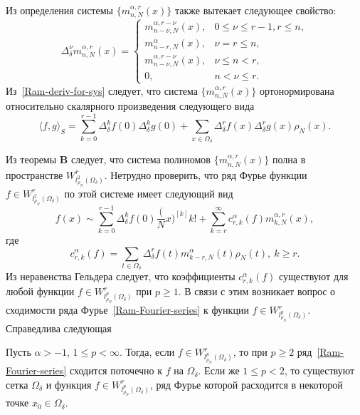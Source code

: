 Из определения системы $\{m_{n,N}^{\alpha,r}(x)\}$ также вытекает следующее свойство:
\begin{equation}\label{Ram-deriv-for-sys}
\Delta_\delta^\nu m_{n,N}^{\alpha,r}(x)=
\begin{cases}
m_{n-\nu,N}^{\alpha,r-\nu}(x),& 0\le\nu\le r-1, r\le n,\\
m_{n-r,N}^{\alpha}(x),& \nu=r\le n,\\
m_{n-\nu,N}^{\alpha,r-\nu}(x),& \nu\le n<r,\\
0,& n<\nu\le r.
\end{cases}
\end{equation}
Из~\eqref{Ram-deriv-for-sys} следует, что система $\{m_{n,N}^{\alpha,r}(x)\}$ ортонормирована относительно скалярного произведения следующего вида
\begin{equation*}
\langle f,g\rangle_S=\sum_{k=0}^{r-1}\Delta_\delta^kf(0)\Delta_\delta^kg(0)+\sum_{x\in\Omega_\delta}\Delta_\delta^rf(x)\Delta_\delta^rg(x)\rho_N(x).
\end{equation*}

Из теоремы \textbf{B} следует, что система полиномов $\{m_{n,N}^{\alpha,r}(x)\}$ полна в пространстве $W^r_{l^2_{\rho_N}(\Omega_\delta)}$. Нетрудно проверить, что ряд Фурье функции $f\in W^r_{l^2_{\rho_N}(\Omega_\delta)}$ по этой системе имеет следующий вид
\begin{equation}\label{Ram-Fourier-series}
f(x)\sim \sum_{k=0}^{r-1}\Delta_\delta^kf(0){\frac(Nx)^{[k]}{k!}}+\sum_{k=r}^\infty c^\alpha_{r,k}(f)m^{\alpha,r}_{k,N}(x),
\end{equation}
где
\begin{equation*}
c^\alpha_{r,k}(f)=\sum_{t\in\Omega_\delta}\Delta_\delta^r f(t)m^\alpha_{k-r,N}(t)\rho_N(t),\ k\ge r.
\end{equation*}
Из неравенства Гельдера следует, что коэффициенты $c^\alpha_{r,k}(f)$ существуют для любой функции $f\in W^r_{l^p_{\rho_N}(\Omega_\delta)}$ при $p\ge 1$. В связи с этим возникает вопрос о сходимости ряда Фурье~\eqref{Ram-Fourier-series} к функции $f\in W^r_{l^p_{\rho_N}(\Omega_\delta)}$. Справедлива следующая
\begin{theorem}\label{Ram-theoMex1}
Пусть $\alpha>-1$, $1\le p<\infty$. Тогда, если $f\in W^r_{l^p_{\rho_N}(\Omega_\delta)}$, то при $p\ge2$ ряд~\eqref{Ram-Fourier-series} сходится поточечно к $f$ на $\Omega_\delta$. Если же $1\le p<2$, то существуют сетка $\Omega_\delta$ и функция $f\in W^r_{l^p_{\rho_N}(\Omega_\delta)}$, ряд Фурье которой расходится в некоторой точке $x_0\in \Omega_\delta$.
\end{theorem}

